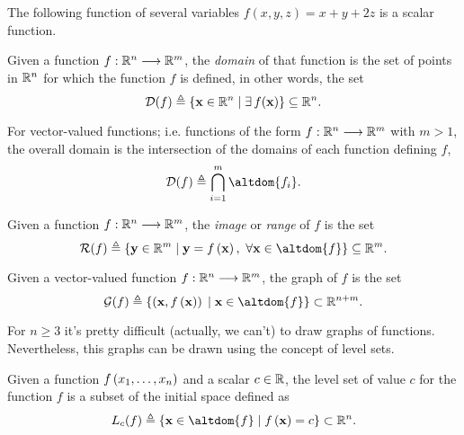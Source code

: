 \begin{example}
    The following function of several variables $f(x, y, z) = x + y + 2z$ is a scalar function.
\end{example}


\begin{defn}[Domain]
Given a function $\stdvf$, the \textit{domain} of that function is the set of points in $\Rtn$ for which the function $f$ is 
defined, in other words, the set
\begin{equation}
\dom{f} \bydef \{\vec{x}\in\Rtn\st\exists f(\vec{x})\}\subseteq\Rtn.
\end{equation}
\end{defn}

\noindent For vector-valued functions; i.e. functions of the form $\stdvf$ with $m > 1$, the overall domain is the intersection of the
domains of each function defining $f$,
\begin{equation}
\dom{f}\bydef\bigcap_{i=1}^m\altdom{f_i}.
\end{equation}

\begin{defn}[Image]
Given a function $\stdvf$, the \textit{image} or \textit{range} of $f$ is the set
\begin{equation}
\image{f}\bydef\{\vec{y}\in\R^m\st \vec{y} = f\left(\vec{x}\right),\ \forall\vec{x}\in\altdom{f}\}\subseteq\R^m.
\end{equation}
\end{defn}

\begin{defn}[Graph]
Given a vector-valued function $\stdvf$, the graph of $f$ is the set
\begin{equation}
\fgraph{f}\bydef\{\left(\vec{x}, f\left(\vec{x}\right)\right)\st\vec{x}\in\altdom{f}\}\subset\R^{n + m}.
\end{equation}
\end{defn}

For $n\geq 3$ it's pretty difficult (actually, we can't) to draw graphs of functions. Nevertheless, this graphs
can be drawn using the concept of level sets.

\begin{defn}
Given a function $f\left(x_1, \ldots, x_n\right)$ and a scalar $c\in\R$, the level set of value $c$ for the function $f$ is a subset of the initial space
defined as
\begin{equation}
\levelset{c}{f} \bydef \{\vec{x}\in\altdom{f}\st f\left(\vec{x}\right) = c\}\subset\Rtn.
\end{equation}
\end{defn}

